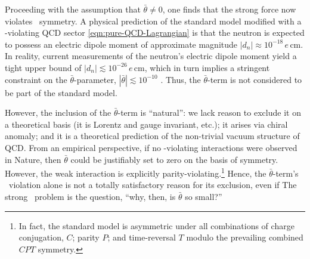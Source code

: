 Proceeding with the assumption that $\bar θ \ne 0$, one finds that the strong force now violates \CP\ symmetry.
A physical prediction of the standard model modified with a \CP-violating QCD sector \eqref{eqn:pure-QCD-Lagrangian} is that the neutron is expected to possess an electric dipole moment of approximate magnitude $|d_n| \approx 10^{-18} \,e\,\mathrm{cm}$.
In reality, current measurements \cite{electric_dipole_neutron_2020} of the neutron's electric dipole moment yield a tight upper bound of $|d_n| \lesssim 10^{-26} \,e\,\mathrm{cm}$, which in turn implies a stringent constraint on the $\bar θ$-parameter, $|\bar θ| \lesssim 10^{-10}$ \cite{ParticleDataGroup-review-2020}.
Thus, the $\bar θ$-term is not considered to be part of the standard model.


However, the inclusion of the $\bar θ$-term is ``natural'': we lack reason to exclude it on a theoretical basis (it is Lorentz and gauge invariant, etc.); it arises via chiral anomaly; and it is a theoretical prediction of the non-trivial vacuum structure of QCD.
From an empirical perspective, if no \CP-violating interactions were observed in Nature, then $\bar θ$ could be justifiably set to zero on the basis of symmetry.
However, the weak interaction is explicitly parity-violating.\footnote{
	In fact, the standard model is asymmetric under all combinations of charge conjugation, $C$; parity $P$; and time-reversal $T$ modulo the prevailing combined $CPT$ symmetry.
}
Hence, the $\bar θ$-term's \CP\ violation alone is not a totally satisfactory reason for its exclusion, even if 
The strong \CP\ problem is the question, ``why, then, is $\bar θ$ so small?''
